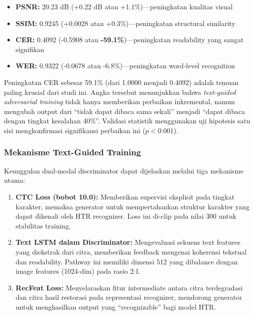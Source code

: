 \begin{itemize}
    \item \textbf{PSNR:} 20.23 dB (+0.22 dB atau +1.1\%)---peningkatan kualitas visual
    \item \textbf{SSIM:} 0.9245 (+0.0028 atau +0.3\%)---peningkatan structural similarity
    \item \textbf{CER:} 0.4092 (-0.5908 atau \textbf{-59.1\%})---peningkatan readability yang sangat signifikan
    \item \textbf{WER:} 0.9322 (-0.0678 atau -6.8\%)---peningkatan word-level recognition
\end{itemize}

Peningkatan CER sebesar 59.1\% (dari 1.0000 menjadi 0.4092) adalah temuan paling krusial dari studi ini. Angka tersebut menunjukkan bahwa \textit{text-guided adversarial training} tidak hanya memberikan perbaikan inkremental, namun mengubah output dari ``tidak dapat dibaca sama sekali'' menjadi ``dapat dibaca dengan tingkat kesalahan 40\%''. Validasi statistik menggunakan uji hipotesis satu sisi mengkonfirmasi signifikansi perbaikan ini ($p < 0.001$).

\subsubsection{Mekanisme Text-Guided Training}

Keunggulan dual-modal discriminator dapat dijelaskan melalui tiga mekanisme utama:

\begin{enumerate}
    \item \textbf{CTC Loss (bobot 10.0):} Memberikan supervisi eksplisit pada tingkat karakter, memaksa generator untuk mempertahankan struktur karakter yang dapat dikenali oleh HTR recognizer. Loss ini di-clip pada nilai 300 untuk stabilitas training.
    
    \item \textbf{Text LSTM dalam Discriminator:} Mengevaluasi sekuens text features yang diekstrak dari citra, memberikan feedback mengenai koherensi tekstual dan readability. Pathway ini memiliki dimensi 512 yang dibalance dengan image features (1024-dim) pada rasio 2:1.
    
    \item \textbf{RecFeat Loss:} Menyelaraskan fitur intermediate antara citra terdegradasi dan citra hasil restorasi pada representasi recognizer, mendorong generator untuk menghasilkan output yang ``recognizable'' bagi model HTR.
\end{enumerate}

